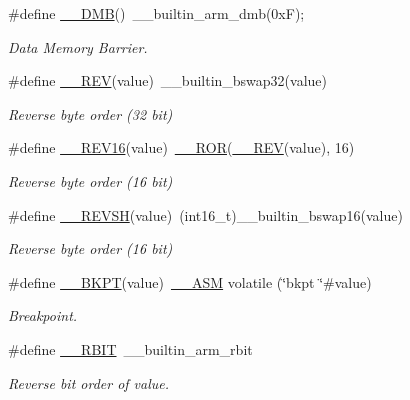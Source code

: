 \begin{DoxyCompactItemize}
\#define \hyperlink{group___c_m_s_i_s___core___instruction_interface_ga671101179b5943990785f36f8c1e2269}{\+\_\+\+\_\+\+D\+MB}()~\+\_\+\+\_\+builtin\+\_\+arm\+\_\+dmb(0x\+F);
\begin{DoxyCompactList}\small\item\em Data Memory Barrier. \end{DoxyCompactList}\item 
\#define \hyperlink{group___c_m_s_i_s___core___instruction_interface_gaca25a02e09983da5558f5242f2f635bc}{\+\_\+\+\_\+\+R\+EV}(value)~\+\_\+\+\_\+builtin\+\_\+bswap32(value)
\begin{DoxyCompactList}\small\item\em Reverse byte order (32 bit) \end{DoxyCompactList}\item 
\#define \hyperlink{group___c_m_s_i_s___core___instruction_interface_gad35497777af37e7809271b5e6f9510ba}{\+\_\+\+\_\+\+R\+E\+V16}(value)~\hyperlink{cmsis__iccarm_8h_a7105032649bf6158d4d2d5dc38a3f94c}{\+\_\+\+\_\+\+R\+OR}(\hyperlink{group___c_m_s_i_s___core___instruction_interface_gadb92679719950635fba8b1b954072695}{\+\_\+\+\_\+\+R\+EV}(value), 16)
\begin{DoxyCompactList}\small\item\em Reverse byte order (16 bit) \end{DoxyCompactList}\item 
\#define \hyperlink{group___c_m_s_i_s___core___instruction_interface_gae580812686119c9c5cf3c11a7519a404}{\+\_\+\+\_\+\+R\+E\+V\+SH}(value)~(int16\+\_\+t)\+\_\+\+\_\+builtin\+\_\+bswap16(value)
\begin{DoxyCompactList}\small\item\em Reverse byte order (16 bit) \end{DoxyCompactList}\item 
\#define \hyperlink{group___c_m_s_i_s___core___instruction_interface_ga15ea6bd3c507d3e81c3b3a1258e46397}{\+\_\+\+\_\+\+B\+K\+PT}(value)~\hyperlink{cmsis__iccarm_8h_a1378040bcf22428955c6e3ce9c2053cd}{\+\_\+\+\_\+\+A\+SM} volatile (\char`\"{}bkpt \char`\"{}\#value)
\begin{DoxyCompactList}\small\item\em Breakpoint. \end{DoxyCompactList}\item 
\#define \hyperlink{group___c_m_s_i_s___core___instruction_interface_gab83768933a612816fad669db5488366f}{\+\_\+\+\_\+\+R\+B\+IT}~\+\_\+\+\_\+builtin\+\_\+arm\+\_\+rbit
\begin{DoxyCompactList}\small\item\em Reverse bit order of value. \end{DoxyCompactList}\item 

\end{DoxyCompactItemize}
